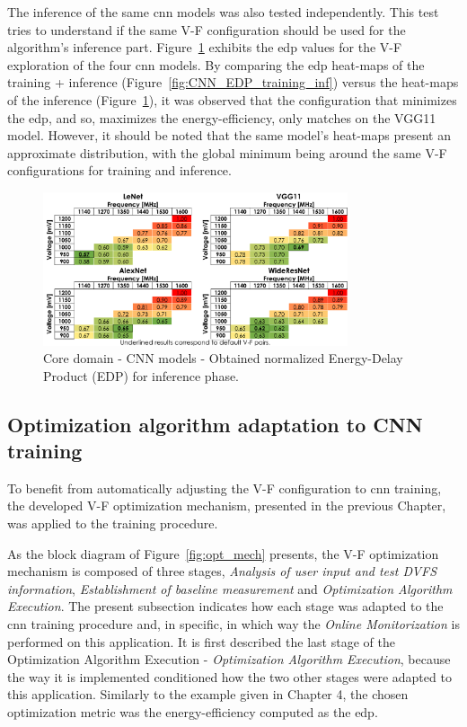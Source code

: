 The inference of the same \acrshort{cnn} models was also tested independently. This test tries to understand if the same V-F configuration should be used for the algorithm's inference part. Figure~\ref{fig:CNN_EDP_inf} exhibits the \acrshort{edp} values for the V-F exploration of the four \acrshort{cnn} models. By comparing the \acrshort{edp} heat-maps of the training + inference (Figure~\ref{fig:CNN_EDP_training_inf}) versus the heat-maps of the inference (Figure~\ref{fig:CNN_EDP_inf}), it was observed that the configuration that minimizes the \acrshort{edp}, and so, maximizes the energy-efficiency, only matches on the VGG11 model. However, it should be noted that the same model's heat-maps present an approximate distribution, with the global minimum being around the same V-F configurations for training and inference.

\begin{figure}[htb]
    \centering
        \includegraphics[width=0.8\textwidth]{Figures/Application To Deep Learning/CNN_EDP_inf.pdf}
        \caption{Core domain - CNN models - Obtained normalized Energy-Delay Product (EDP) for inference phase.}
    \label{fig:CNN_EDP_inf}
\end{figure}

\subsection{Optimization algorithm adaptation to CNN training}

To benefit from automatically adjusting the V-F configuration to \acrshort{cnn} training, the developed V-F optimization mechanism, presented in the previous Chapter, was applied to the training procedure.

As the block diagram of Figure~\ref{fig:opt_mech} presents, the V-F optimization mechanism is composed of three stages, \textit{Analysis of user input and test DVFS information}, \textit{Establishment of baseline measurement} and \textit{Optimization Algorithm Execution}. The present subsection indicates how each stage was adapted to the \acrshort{cnn} training procedure and, in specific, in which way the \textit{Online Monitorization} is performed on this application. It is first described the last stage of the Optimization Algorithm Execution - \textit{Optimization Algorithm Execution}, because the way it is implemented conditioned how the two other stages were adapted to this application. Similarly to the example given in Chapter 4, the chosen optimization metric was the energy-efficiency computed as the \acrshort{edp}. 


